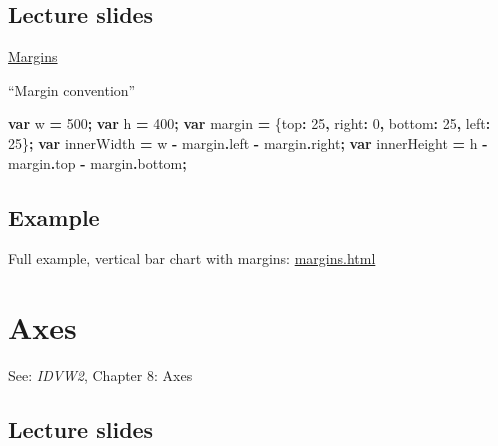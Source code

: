 \documentclass[
  openany]{book}
\newenvironment{Shaded}{\begin{snugshade}}{\end{snugshade}}
\newcommand{\AttributeTok}[1]{\textcolor[rgb]{0.77,0.63,0.00}{#1}}
\newcommand{\DataTypeTok}[1]{\textcolor[rgb]{0.13,0.29,0.53}{#1}}
\newcommand{\DecValTok}[1]{\textcolor[rgb]{0.00,0.00,0.81}{#1}}
\newcommand{\KeywordTok}[1]{\textcolor[rgb]{0.13,0.29,0.53}{\textbf{#1}}}
\newcommand{\NormalTok}[1]{#1}
\newcommand{\OperatorTok}[1]{\textcolor[rgb]{0.81,0.36,0.00}{\textbf{#1}}}
\begin{document}
\hypertarget{lecture-slides-2}{%
\subsection{\texorpdfstring{Lecture slides }{Lecture slides }}\label{lecture-slides-2}}

\href{pdfs/margins.pdf}{Margins}

``Margin convention''

\begin{Shaded}
\begin{Highlighting}[]
  \KeywordTok{var}\NormalTok{ w }\OperatorTok{=} \DecValTok{500}\OperatorTok{;}
  \KeywordTok{var}\NormalTok{ h }\OperatorTok{=} \DecValTok{400}\OperatorTok{;}
  \KeywordTok{var}\NormalTok{ margin }\OperatorTok{=}\NormalTok{ \{}\DataTypeTok{top}\OperatorTok{:} \DecValTok{25}\OperatorTok{,} \DataTypeTok{right}\OperatorTok{:} \DecValTok{0}\OperatorTok{,} \DataTypeTok{bottom}\OperatorTok{:} \DecValTok{25}\OperatorTok{,} \DataTypeTok{left}\OperatorTok{:} \DecValTok{25}\NormalTok{\}}\OperatorTok{;}
  \KeywordTok{var}\NormalTok{ innerWidth }\OperatorTok{=}\NormalTok{ w }\OperatorTok{{-}}\NormalTok{ margin}\OperatorTok{.}\AttributeTok{left} \OperatorTok{{-}}\NormalTok{ margin}\OperatorTok{.}\AttributeTok{right}\OperatorTok{;}
  \KeywordTok{var}\NormalTok{ innerHeight }\OperatorTok{=}\NormalTok{ h }\OperatorTok{{-}}\NormalTok{ margin}\OperatorTok{.}\AttributeTok{top} \OperatorTok{{-}}\NormalTok{ margin}\OperatorTok{.}\AttributeTok{bottom}\OperatorTok{;}
\end{Highlighting}
\end{Shaded}

\hypertarget{example}{%
\subsection{Example}\label{example}}

Full example, vertical bar chart with margins: \href{code/margins.html}{margins.html}

\hypertarget{axes}{%
\section{Axes}\label{axes}}

See: \emph{IDVW2}, Chapter 8: Axes

\hypertarget{lecture-slides-3}{%
\subsection{\texorpdfstring{Lecture slides }{Lecture slides }}\label{lecture-slides-3}}
\end{document}
